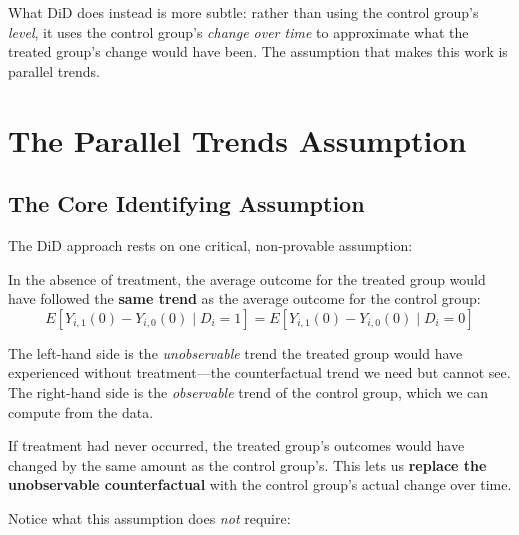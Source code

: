 \documentclass[
  letterpaper,
  DIV=11,
  numbers=noendperiod]{scrreprt}
\begin{document}
What DiD does instead is more subtle: rather than using the control
group's \emph{level}, it uses the control group's \emph{change over
time} to approximate what the treated group's change would have been.
The assumption that makes this work is parallel trends.

\section{The Parallel Trends
Assumption}\label{the-parallel-trends-assumption}

\subsection{The Core Identifying
Assumption}\label{the-core-identifying-assumption}

The DiD approach rests on one critical, non-provable assumption:

\begin{tcolorbox}[enhanced jigsaw, arc=.35mm, bottomrule=.15mm, bottomtitle=1mm, breakable, colback=white, colbacktitle=quarto-callout-important-color!10!white, colframe=quarto-callout-important-color-frame, coltitle=black, left=2mm, leftrule=.75mm, opacityback=0, opacitybacktitle=0.6, rightrule=.15mm, title=\textcolor{quarto-callout-important-color}{\faExclamation}\hspace{0.5em}{Parallel Trends Assumption}, titlerule=0mm, toprule=.15mm, toptitle=1mm]

In the absence of treatment, the average outcome for the treated group
would have followed the \textbf{same trend} as the average outcome for
the control group: \[
E[Y_{i,1}(0) - Y_{i,0}(0) \mid D_i = 1] = E[Y_{i,1}(0) - Y_{i,0}(0) \mid D_i = 0]
\]

\end{tcolorbox}

The left-hand side is the \emph{unobservable} trend the treated group
would have experienced without treatment---the counterfactual trend we
need but cannot see. The right-hand side is the \emph{observable} trend
of the control group, which we can compute from the data.

If treatment had never occurred, the treated group's outcomes would have
changed by the same amount as the control group's. This lets us
\textbf{replace the unobservable counterfactual} with the control
group's actual change over time.

Notice what this assumption does \emph{not} require:
\end{document}
